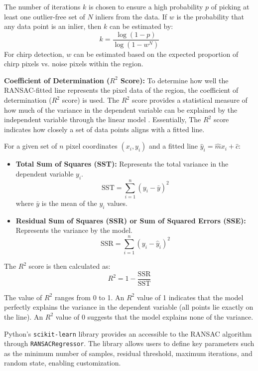 \documentclass[class=report,11pt,crop=false]{standalone}
\begin{document}
The number of iterations $k$ is chosen to ensure a high probability $p$ of picking at least one outlier-free set of $N$ inliers from the data. If $w$ is the probability that any data point is an inlier, then $k$ can be estimated by:
\begin{equation}
k = \frac{\log(1 - p)}{\log(1 - w^N)}
\label{eq:ransac_iterations}
\end{equation}
For chirp detection, $w$ can be estimated based on the expected proportion of chirp pixels vs. noise pixels within the region. \cite{b25}

\textbf{Coefficient of Determination ($R^2$ Score):}
To determine how well the RANSAC-fitted line represents the pixel data of the region, the coefficient of determination ($R^2$ score) is used. The $R^2$ score provides a statistical measure of how much of the variance in the dependent variable can be explained by the independent variable through the linear model \cite{b24}. Essentially, The $R^2$ score indicates how closely a set of data points aligns with a fitted line.

For a given set of $n$ pixel coordinates $(x_i, y_i)$ and a fitted line $\hat{y}_i = \hat{m} x_i + \hat{c}$:
\begin{itemize}
 \item \textbf{Total Sum of Squares (SST):} Represents the total variance in the dependent variable $y_i$.
$$ \text{SST} = \sum_{i=1}^n (y_i - \bar{y})^2 $$
 where $\bar{y}$ is the mean of the $y_i$ values.
 \item \textbf{Residual Sum of Squares (SSR) or Sum of Squared Errors (SSE):} Represents the variance by the model.
 $$ \text{SSR} = \sum_{i=1}^n (y_i - \hat{y}_i)^2 $$
\end{itemize}

The $R^2$ score is then calculated as:
\begin{equation}
\label{eq:r^2}
R^2 = 1 - \frac{\text{SSR}}{\text{SST}}
\end{equation}

The value of $R^2$ ranges from 0 to 1. An $R^2$ value of 1 indicates that the model perfectly explains the variance in the dependent variable (all points lie exactly on the line). An $R^2$ value of 0 suggests that the model explains none of the variance.

Python's \texttt{scikit-learn} library provides an accessible to the RANSAC algorithm through \texttt{RANSACRegressor}. The library allows users to define key parameters such as the minimum number of samples, residual threshold, maximum iterations, and random state, enabling customization.
\end{document}
